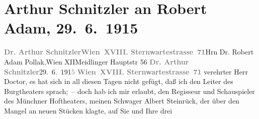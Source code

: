 

         
         \renewcommand{\erwaehntePersonen}{Personen: Robert Adam, Albert Steinrück, Hugo Thimig}
         \renewcommand{\erwaehnteInstitutionen}{Institutionen: Nationaltheater München}
         \renewcommand{\erwaehnteOrte}{Orte: Burgtheater, Meidlinger Hauptstraße, Sternwartestraße, Villa Annerl, Villa Zufriedenheit, Wien, XII., Meidling}
         \renewcommand{\erwaehnteWerke}{Werke: Der Fremde, Die Geschichte des Alî ibn Bekkâr mit Schams an-Nahâr, Fatme}
               \section[Arthur Schnitzler an Robert Adam, 29. 6. 1915]{ Arthur Schnitzler an Robert Adam, 29. 6. 1915}\nopagebreak{}\rehead{ }\begin{ledgroupsized}[t]{13cm}\normalsize\beginnumbering \toendnotes[C]{\smallbreak\pagebreak[2]} 
\toendnotes[C]{\smallbreak}\pstart{}{\pb}\textcolor{gray}{\textbf{Dr. Arthur Schnitzler}}\pend{}\pstart{}\textcolor{gray}{\textbf{Wien XVIII. Sternwartestrasse 71}}\pend{}{\bigskip}\pstart{}{\pb}Hrn Dr. Robert Adam Pollak,\pend{}\pstart{}Wien XII\pend{}\pstart{}Meidlinger Hauptstr 56\pend{}{\bigskip}\pstart
           \noindent{}{\pb}\textcolor{gray}{\textbf{Dr. Arthur Schnitzler}}\hfill 29. 6. 191\textcolor{gray}{5}\pend
           \pstart
           \textcolor{gray}{\textbf{Wien XVIII. Sternwartestrasse 71}}\pend
           \pstart
           verehrter Herr Doctor, es hat sich in all diesen Tagen nicht gefügt,
               daß ich den Leiter des Burgtheaters sprach; – doch hab ich mir erlaubt,
               den Regisseur und Schauspieler des Münchner
                  Hoftheaters, meinen Schwager Albert
                  Steinrück, der über den Mangel an neuen Stücken klagte, auf Sie und Ihre drei

\end{ledgroupsized}
